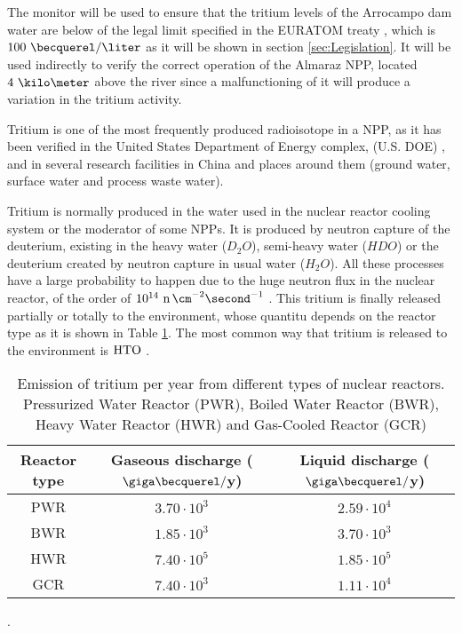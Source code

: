 The monitor will be used to ensure that the tritium levels of the Arrocampo dam  water are below of the legal limit specified in the EURATOM treaty \cite{100BqL}, which is $100~\becquerel/\liter$ as it will be shown in section \ref{sec:Legislation}. It will be used indirectly to verify the correct operation of the Almaraz NPP, located $4~\kilo\meter$ above the river since a malfunctioning of it will produce a variation in the tritium activity.

Tritium is one of the most frequently produced radioisotope in a NPP, as it has been verified in the United States Department of Energy complex, (U.S. DOE) \cite{FiberDetector1a}, \cite{FiberDetector1b} and in several research facilities in China \cite{CommonEmissionTritium} and places around them (ground water, surface water and process waste water).

Tritium is normally produced in the water used in the nuclear reactor cooling system or the moderator of some NPPs. It is produced by neutron capture of the deuterium, existing in the heavy water ($D_2 O$), semi-heavy water ($H D O$) or the deuterium created by neutron capture in usual water ($H_2 O$). All these processes have a large probability to happen due to the huge neutron flux in the nuclear reactor, of the order of $10^{14} ~\ce{n} \, \cm^{-2} \second^{-1}$ \cite{CrossSeccionNeutrons}. This tritium is finally released partially or totally to the environment, whose quantitu depends on the reactor type as it is shown in Table \ref{tab:TritiumEmisionsNPPs}. The most common way that tritium is released to the environment is $\ce{HTO}$ \cite{CommonEmissionTritium}.

\begin{table}[htbp]
\begin{center}
\begin{tabular}{|c|c|c|}
\hline
Reactor type & Gaseous discharge ($\giga\becquerel/$y) & Liquid discharge ($\giga\becquerel/$y) \\
\hline \hline \hline
PWR & $3.70\cdot 10^{3}$ & $2.59\cdot 10^{4}$ \\ \hline
BWR & $1.85\cdot 10^{3}$ & $3.70\cdot 10^{3}$ \\ \hline
HWR & $7.40\cdot 10^{5}$ & $1.85\cdot 10^{5}$ \\ \hline
GCR & $7.40\cdot 10^{3}$ & $1.11\cdot 10^{4}$ \\ \hline
\end{tabular}
\caption{Emission of tritium per year from different types of nuclear reactors. Pressurized Water Reactor (PWR), Boiled Water Reactor (BWR), Heavy Water Reactor (HWR) and Gas-Cooled Reactor (GCR) \cite{CommonEmissionTritium}}.
\label{tab:TritiumEmisionsNPPs}
\end{center}
\end{table} 

